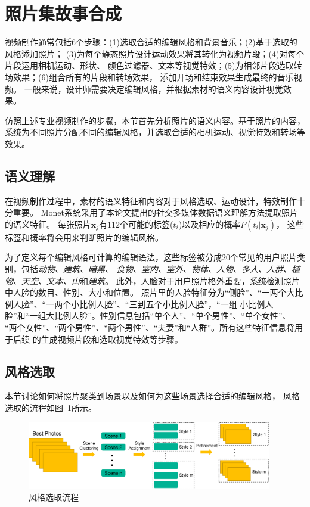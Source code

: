 \documentclass[doctor]{ustcthesis}
\def \x {\mathbf{x}}
\begin{document}
\section{照片集故事合成}
视频制作通常包括6个步骤：(1)选取合适的编辑风格和背景音乐；(2)基于选取的风格添加照片；
(3)为每个静态照片设计运动效果将其转化为视频片段；(4)对每个片段运用相机运动、形状、
颜色过滤器、文本等视觉特效；(5)为相邻片段选取转场效果；(6)组合所有的片段和转场效果，
添加开场和结束效果生成最终的音乐视频。
一般来说，设计师需要决定编辑风格，并根据素材的语义内容设计视觉效果。

仿照上述专业视频制作的步骤，本节首先分析照片的语义内容。基于照片的内容，
系统为不同照片分配不同的编辑风格，并选取合适的相机运动、视觉特效和转场等效果。

\vspace{-1em}
\subsection{语义理解}
在视频制作过程中，素材的语义特征和内容对于风格选取、运动设计，特效制作十分重要。
Monet系统采用了本论文提出的社交多媒体数据语义理解方法提取照片的语义特征。
每张照片$\x_j$有$112$个可能的标签($t_i$)以及相应的概率$P(t_i|\x_j)$，
这些标签和概率将会用来判断照片的编辑风格。

为了定义每个编辑风格可计算的编辑语法，这些标签被分成$20$个常见的用户照片类别，包括\emph{动物、建筑、暗黑、
食物、室内、室外、物体、人物、多人、人群、植物、天空、文本、山}和\emph{建筑}。
此外，人脸对于用户照片格外重要，系统检测照片中人脸的数目、性别、大小和位置。
照片里的人脸特征分为``侧脸''、``一两个大比例人脸''、``一两个小比例人脸''、``三到五个小比例人脸''，``一组
小比例人脸''和``一组大比例人脸''。性别信息包括``单个人''、``单个男性''、``单个女性''、
``两个女性''、``两个男性''、``两个男性''、``夫妻''和``人群''。所有这些特征信息将用于后续
的生成视频片段和选取视觉特效等步骤。

\subsection{风格选取}
本节讨论如何将照片聚类到场景以及如何为这些场景选择合适的编辑风格，
风格选取的流程如图~\ref{fig:style-assignment}所示。
\begin{figure}[t]
    \centering
    \includegraphics[clip=true, width=0.95\textwidth]{style-assignment.pdf}
    \caption{风格选取流程}
    \label{fig:style-assignment}
    \vspace{-2em}
\end{figure}
\end{document}
